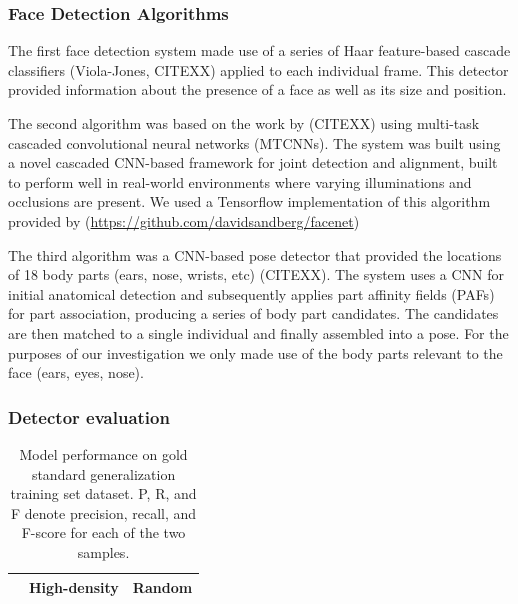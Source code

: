 \documentclass[10pt, letterpaper]{article}
\begin{document}
\subsubsection{Face Detection
Algorithms}\label{face-detection-algorithms}

The first face detection system made use of a series of Haar
feature-based cascade classifiers (Viola-Jones, CITEXX) applied to each
individual frame. This detector provided information about the presence
of a face as well as its size and position.

The second algorithm was based on the work by (CITEXX) using multi-task
cascaded convolutional neural networks (MTCNNs). The system was built
using a novel cascaded CNN-based framework for joint detection and
alignment, built to perform well in real-world environments where
varying illuminations and occlusions are present. We used a Tensorflow
implementation of this algorithm provided by
(\url{https://github.com/davidsandberg/facenet})

The third algorithm was a CNN-based pose detector that provided the
locations of 18 body parts (ears, nose, wrists, etc) (CITEXX). The
system uses a CNN for initial anatomical detection and subsequently
applies part affinity fields (PAFs) for part association, producing a
series of body part candidates. The candidates are then matched to a
single individual and finally assembled into a pose. For the purposes of
our investigation we only made use of the body parts relevant to the
face (ears, eyes, nose).

\subsubsection{Detector evaluation}\label{detector-evaluation}

\begin{table}[t]
  \caption{Model performance on gold standard generalization training set dataset. P, R, and F denote precision, recall, and F-score for each of the two samples. \label{tab:model_eval}}
  \begin{center}
    \begin{tabular}{l|ccc|ccc}
      \hline
       &  \multicolumn{3}{c|}{High-density} &  \multicolumn{3}{c}{Random} \\
      \hline
    \hline
    \end{tabular}
  \end{center}
\end{table}
\end{document}
